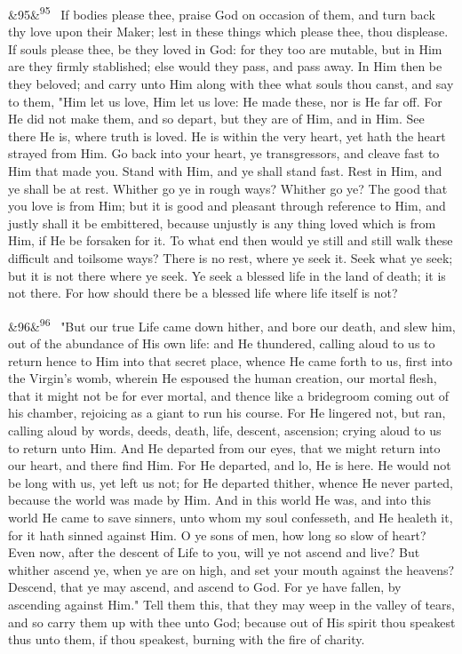 \documentclass[12pt]{article}
\newcommand{\para}[1][]{\par\noindent\ifx&#1&\else\textsuperscript{\footnotesize #1}~\fi}
\begin{document}
\para[95] If bodies please thee, praise God on occasion of them, and turn back thy love upon their Maker; lest in these things which please thee, thou displease. If souls please thee, be they loved in God: for they too are mutable, but in Him are they firmly stablished; else would they pass, and pass away. In Him then be they beloved; and carry unto Him along with thee what souls thou canst, and say to them, "Him let us love, Him let us love: He made these, nor is He far off. For He did not make them, and so depart, but they are of Him, and in Him. See there He is, where truth is loved. He is within the very heart, yet hath the heart strayed from Him. Go back into your heart, ye transgressors, and cleave fast to Him that made you. Stand with Him, and ye shall stand fast. Rest in Him, and ye shall be at rest. Whither go ye in rough ways? Whither go ye? The good that you love is from Him; but it is good and pleasant through reference to Him, and justly shall it be embittered, because unjustly is any thing loved which is from Him, if He be forsaken for it. To what end then would ye still and still walk these difficult and toilsome ways? There is no rest, where ye seek it. Seek what ye seek; but it is not there where ye seek. Ye seek a blessed life in the land of death; it is not there. For how should there be a blessed life where life itself is not?

\para[96] "But our true Life came down hither, and bore our death, and slew him, out of the abundance of His own life: and He thundered, calling aloud to us to return hence to Him into that secret place, whence He came forth to us, first into the Virgin's womb, wherein He espoused the human creation, our mortal flesh, that it might not be for ever mortal, and thence like a bridegroom coming out of his chamber, rejoicing as a giant to run his course. For He lingered not, but ran, calling aloud by words, deeds, death, life, descent, ascension; crying aloud to us to return unto Him. And He departed from our eyes, that we might return into our heart, and there find Him. For He departed, and lo, He is here. He would not be long with us, yet left us not; for He departed thither, whence He never parted, because the world was made by Him. And in this world He was, and into this world He came to save sinners, unto whom my soul confesseth, and He healeth it, for it hath sinned against Him. O ye sons of men, how long so slow of heart? Even now, after the descent of Life to you, will ye not ascend and live? But whither ascend ye, when ye are on high, and set your mouth against the heavens? Descend, that ye may ascend, and ascend to God. For ye have fallen, by ascending against Him." Tell them this, that they may weep in the valley of tears, and so carry them up with thee unto God; because out of His spirit thou speakest thus unto them, if thou speakest, burning with the fire of charity.
\end{document}
